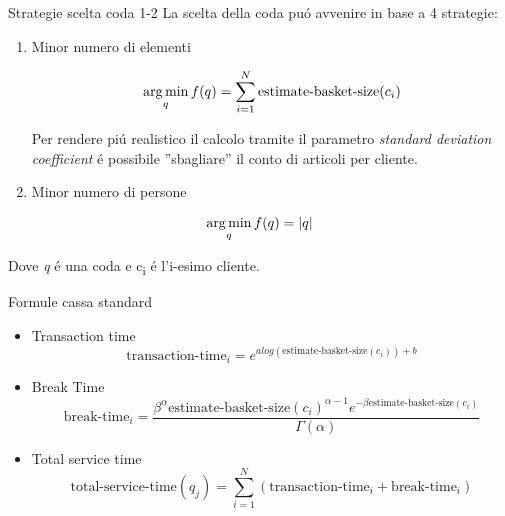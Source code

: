 \begin{frame}{Strategie scelta coda 1-2}
  La scelta della coda puó avvenire in base a 4 strategie:
  \begin{enumerate}
  \item Minor numero di elementi

    \begin{equation}
      \operatorname*{arg\,min}_q f(q) = \sum\limits_{i=1}^N \text{estimate-basket-size}(c_i) 
    \end{equation}

    Per rendere piú realistico il calcolo tramite il parametro
    \textit{standard deviation coefficient} é possibile ''sbagliare''
    il conto di articoli per cliente.
    
  \item Minor numero di persone
   \end{enumerate}
   
   \begin{equation}
     \operatorname*{arg\,min}_q f(q) = |q|
   \end{equation}

   Dove \textit{q} é una coda e c\textsubscript{i} é l'i-esimo
   cliente.   
 \end{frame}



\begin{frame}{Formule cassa standard}
  \begin{itemize}
  \item Transaction time
    \begin{equation}
      \text{transaction-time}_i = e^{a log(\text{estimate-basket-size}(c_i)) + b}
    \end{equation}
\item Break Time
  \begin{equation}
    \text{break-time}_i = \frac{\beta^{\alpha} \text{estimate-basket-size}(c_i)^{\alpha - 1} e^{- \beta \text{estimate-basket-size}(c_i)}}{\Gamma (\alpha)}
  \end{equation}  
\item Total service time
  \begin{equation}
    \text{total-service-time}(q_j) = \sum\limits_{i=1}^N \left( \text{transaction-time}_i + \text{break-time}_i \right)
  \end{equation}
\end{itemize}  
\end{frame}

